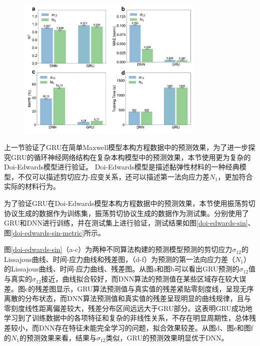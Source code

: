 \begin{figure}[htbp]
  \centering
  \includegraphics[width=0.8\textwidth]{Fig/doi-edwards-sin-metrics.pdf}
\end{figure}

上一节验证了GRU在简单Maxwell模型本构方程数据中的预测效果，为了进一步探究GRU的循环神经网络结构在复杂本构模型中的预测效果，本节使用更为复杂的Doi-Edwards模型进行验证。
Doi-Edwards模型是描述黏弹性材料的一种经典模型，不仅可以描述剪切应力-应变关系，还可以描述第一法向应力差$N_1$，更加符合实际的材料行为。

为了验证GRU在Doi-Edwards模型本构方程数据中的预测效果，本节使用振荡剪切协议生成的数据作为训练集，振荡剪切协议生成的数据作为测试集。分别使用了GRU和DNN进行训练，并在测试集上进行验证，测试结果如图\ref{doi-edwards-sin}、图\ref{doi-edwards-sin-metric}所示。

图\ref{doi-edwards-sin}（a-c）为两种不同算法构建的预测模型预测的剪切应力$\sigma_{12}$的Lissajous曲线、时间-应力曲线和残差图，（d-f）为预测的第一法向应力差（$N_1$）的Lissajous曲线、时间-应力曲线、残差图。从图a和图b可以看出GRU预测的$\sigma_{12}$值与真实的$\sigma_{12}$接近，曲线拟合较好，而DNN算法的预测值在某些区域存在较大误差。图c的残差图显示，GRU算法预测值与真实值的残差紧贴零刻度线，呈现无序离散的分布状态，而DNN算法预测值和真实值的残差呈现明显的曲线规律，且与零刻度线性距离偏差较大，残差分布区间远远大于GRU部分。这表明GRU成功地学习到了训练数据中的各项特征和复杂的非线性关系，不存在明显周期性，总体残差较小，而DNN存在特征未能完全学习的问题，拟合效果较差。从图d、图e和图f的$N_1$的预测效果来看，结果与$\sigma_{12}$类似，GRU的预测效果明显优于DNN。

